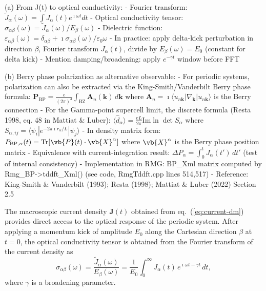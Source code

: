 (a) From J(t) to optical conductivity:
    - Fourier transform: $\tilde{J}_\alpha(\omega) = \int J_\alpha(t) e^{\imath\omega t} dt$
    - Optical conductivity tensor:
      $\sigma_{\alpha\beta}(\omega) = \tilde{J}_\alpha(\omega) / E_\beta(\omega)$
    - Dielectric function:
      $\varepsilon_{\alpha\beta}(\omega) = \delta_{\alpha\beta} +
       \imath\sigma_{\alpha\beta}(\omega)/\varepsilon_0\omega$
    - In practice: apply delta-kick perturbation in direction $\beta$,
      Fourier transform $J_\alpha(t)$, divide by $E_\beta(\omega)=E_0$
      (constant for delta kick)
    - Mention damping/broadening: apply $e^{-\gamma t}$ window before FFT

(b) Berry phase polarization as alternative observable:
    - For periodic systems, polarization can also be extracted via the
      King-Smith/Vanderbilt Berry phase formula:\cite{king-smith-vanderbilt-1993}
      $\mathbf{P}_{\mathrm{BP}} = \frac{e}{(2\pi)^3}\int_{\mathrm{BZ}}
       \mathbf{A}_n(\mathbf{k})\,d\mathbf{k}$
      where $\mathbf{A}_n = \imath\langle u_{n\mathbf{k}}|\nabla_\mathbf{k}|u_{n\mathbf{k}}\rangle$
      is the Berry connection
    - For the Gamma-point supercell limit, the discrete formula
      (Resta 1998, eq. 48 in Mattiat \& Luber):
      $\langle\hat{d}_\alpha\rangle = \frac{eL}{2\pi}\mathrm{Im}\ln\det S_\alpha$
      where $S_{\alpha,ij} = \langle\psi_i|e^{-2\pi\imath r_\alpha/L}|\psi_j\rangle$
    - In density matrix form: $P_{\mathrm{BP},\alpha}(t) = \mathrm{Tr}[\vb{P}(t)\cdot\vb{X}^\alpha]$
      where $\vb{X}^\alpha$ is the Berry phase position matrix
    - Equivalence with current-integration result:
      $\Delta P_\alpha = \int_0^t J_\alpha(t')\,dt'$
      (test of internal consistency)
    - Implementation in RMG: BP\_Xml matrix computed by
      Rmg\_BP->tddft\_Xml() (see code, RmgTddft.cpp lines 514,517)
    - Reference: King-Smith \& Vanderbilt (1993); Resta (1998);
      Mattiat \& Luber (2022) Section 2.5 %

The macroscopic current density $\mathbf{J}(t)$ obtained from
eq.~(\ref{eq:current-dm}) provides direct access to the optical
response of the periodic system.
After applying a momentum kick of amplitude $E_0$ along the Cartesian
direction $\beta$ at $t=0$, the optical conductivity tensor is obtained
from the Fourier transform of the current density as
\begin{equation}
  \sigma_{\alpha\beta}(\omega)
  = \frac{\tilde{J}_\alpha(\omega)}{E_\beta(\omega)}
  = \frac{1}{E_0}\int_0^\infty J_\alpha(t)\,e^{\imath\omega t - \gamma t}\,dt,
  \label{eq:conductivity}
\end{equation}
where $\gamma$ is a broadening parameter.\cite{yabana-bertsch-1996}

